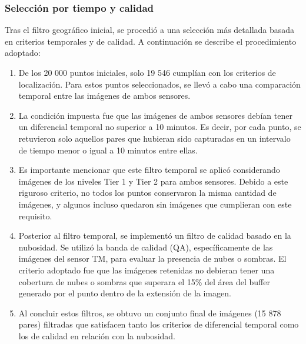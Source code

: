             \subsubsection{Selección por tiempo y calidad}
                Tras el filtro geográfico inicial, se procedió a una selección más detallada basada en criterios temporales y de calidad. A continuación se describe el procedimiento adoptado:
                
                \begin{enumerate}
                    \item De los 20 000 puntos iniciales, solo 19 546 cumplían con los criterios de localización. Para estos puntos seleccionados, se llevó a cabo una comparación temporal entre las imágenes de ambos sensores.
                
                    \item La condición impuesta fue que las imágenes de ambos sensores debían tener un diferencial temporal no superior a 10 minutos. Es decir, por cada punto, se retuvieron solo aquellos pares que hubieran sido capturadas en un intervalo de tiempo menor o igual a 10 minutos entre ellas.
                    
                    \item Es importante mencionar que este filtro temporal se aplicó considerando imágenes de los niveles Tier 1 y Tier 2 para ambos sensores. Debido a este riguroso criterio, no todos los puntos conservaron la misma cantidad de imágenes, y algunos incluso quedaron sin imágenes que cumplieran con este requisito.
                    
                    \item Posterior al filtro temporal, se implementó un filtro de calidad basado en la nubosidad. Se utilizó la banda de calidad (QA), específicamente de las imágenes del sensor TM, para evaluar la presencia de nubes o sombras. El criterio adoptado fue que las imágenes retenidas no debieran tener una cobertura de nubes o sombras que superara el 15\% del área del buffer generado por el punto dentro de la extensión de la imagen.
                    
                    \item Al concluir estos filtros, se obtuvo un conjunto final de imágenes (15 878 pares) filtradas que satisfacen tanto los criterios de diferencial temporal como los de calidad en relación con la nubosidad.
                \end{enumerate}
                
